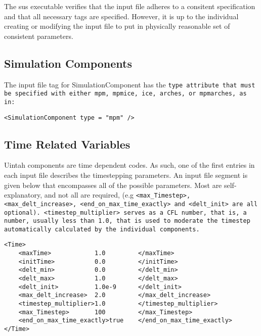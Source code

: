 The sus executable verifies that the input file adheres to a consitent
specification and that all necessary tags are specified.  However, it
is up to the individual creating or modifying the input file to put in
physically reasonable set of consistent parameters.


\subsection{Simulation Components} \label{Sec:SimulationComponent}

The input file tag for SimulationComponent has the \tt type \normalfont
attribute that must be specified with either \tt mpm, mpmice, ice, arches,
\normalfont or \tt mpmarches, \normalfont as in:

\begin{Verbatim}[fontsize=\footnotesize]
<SimulationComponent type = "mpm" />
\end{Verbatim}



\subsection{Time Related Variables} \label{Sec:TimeRelatedVariables}
Uintah components are time dependent codes.  As such, one of the first
entries in each input file describes the timestepping parameters.  An
input file segment is given below that encompasses all of the possible
parameters.  Most are self-explanatory, and not all are required, (e.g
\tt <max\_Timestep>, <max\_delt\_increase>,
<end\_on\_max\_time\_exactly> \normalfont and \tt <delt\_init>
\normalfont are all optional).  \tt <timestep\_multiplier> \normalfont
serves as a CFL number, that is, a number, usually less than 1.0, that
is used to moderate the timestep automatically calculated by the
individual components.

\begin{Verbatim}[fontsize=\footnotesize]
<Time>
    <maxTime>            1.0         </maxTime>
    <initTime>           0.0         </initTime>
    <delt_min>           0.0         </delt_min>
    <delt_max>           1.0         </delt_max>
    <delt_init>          1.0e-9      </delt_init>
    <max_delt_increase>  2.0         </max_delt_increase>
    <timestep_multiplier>1.0         </timestep_multiplier>
    <max_Timestep>       100         </max_Timestep>
    <end_on_max_time_exactly>true    </end_on_max_time_exactly>
</Time>
\end{Verbatim}
%
